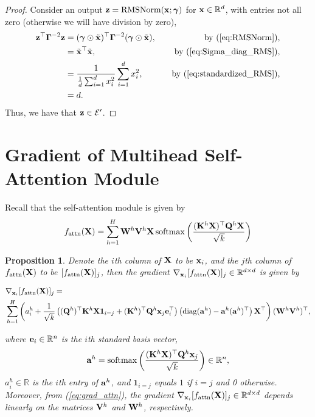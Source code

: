 \documentclass[journal]{IEEEtran}
\newcommand{\bfK}{{\bf K}}
\newcommand{\bfQ}{{\bf Q}}
\newcommand{\bfV}{{\bf V}}
\newcommand{\bfW}{{\bf W}}
\newcommand{\bfX}{{\bf X}}
\newcommand{\bfa}{{\bf a}}
\newcommand{\bfe}{{\bf e}}
\newcommand{\bfx}{{\bf x}}
\newcommand{\bfz}{{\bf z}}
\newcommand{\bfgamma}{{\boldsymbol \gamma}}
\newcommand{\bfGamma}{{\boldsymbol \Gamma}}
\theoremstyle{plain}
\newtheorem{proposition}[theorem]{Proposition}
\theoremstyle{definition}
\theoremstyle{remark}
\begin{document}
\begin{proof}
    Consider an output $\bfz=\text{RMSNorm}(\bfx; \bfgamma)$ for $\bfx \in \mathbb{R}^d$, with entries not all zero (otherwise we will have division by zero),
    \begin{align*}
        \bfz^\top \bfGamma^{-2} \bfz &= (\bfgamma \odot
    \tilde{\bfx})^\top \bfGamma^{-2} (\bfgamma \odot
    \tilde{\bfx}), \quad &\text{by (\ref{eq:RMSNorm}),}\\
    &= \tilde{\bfx}^\top \tilde{\bfx}, \quad &\text{by (\ref{eq:Sigma_diag_RMS}),}\\
    &= \frac{1}{\frac{1}{d}\sum_{i=1}^d x_i^2} \sum_{i=1}^d x_i^2,  \quad &\text{by (\ref{eq:standardized_RMS}),} \\
    &= d.
    \end{align*}
    Thus, we have that $\bfz \in \mathcal{E}'$.
\end{proof} 

\section{Gradient of Multihead Self-Attention Module}
Recall that the self-attention module is given by
\begin{equation}
    f_{\rm attn}(\bfX) = \sum_{h=1}^H  \bfW^h \bfV^h \bfX\, {\rm softmax} \left( \frac{(\bfK^h \bfX)^\top \bfQ^h \bfX}{\sqrt{k}} \right)
\end{equation}

\begin{proposition}\label{prop:grad_attn}
    Denote the $i$th column of $\bfX$ to be $\bfx_i$, and the $j$th column of $f_{\rm attn}(\bfX)$ to be $[f_{\rm attn}(\bfX)]_j$, then the gradient $\nabla_{\bfx_i} [f_{\rm attn}(\bfX)]_j \in \mathbb{R}^{d \times d}$ is given by
    \begin{samepage}
    \begin{align}\label{eq:grad_attn}
    & \nabla_{\bfx_i} [f_{\rm attn}(\bfX)]_j = \\
    & \sum_{h=1}^H \left( a^h_i + \frac{1}{\sqrt{k}} \left((\bfQ^h)^\top \bfK^h \bfX \mathbf{1}_{i=j} + (\bfK^h)^\top \bfQ^h \bfx_j \bfe_i^\top \right) \left({\rm diag}(\bfa^h)-\bfa^h (\bfa^h)^\top \right) \bfX^\top \right) (\bfW^h \bfV^h)^\top ,
    \end{align}
    \end{samepage}
    where $\bfe_i \in \mathbb{R}^{n}$ is the $i$th standard basis vector, 
    $$
    \bfa^h = {\rm softmax} \left( \frac{(\bfK^h \bfX)^\top \bfQ^h \bfx_j}{\sqrt{k}} \right) \in \mathbb{R}^{n},
    $$
    $a^h_i \in \mathbb{R}$ is the $i$th entry of $\bfa^h$, and $\mathbf{1}_{i=j}$ equals $1$ if $i=j$ and 0 otherwise. Moreover, from (\ref{eq:grad_attn}), the gradient $\nabla_{\bfx_i} [f_{\rm attn}(\bfX)]_j \in \mathbb{R}^{d \times d}$ depends linearly on the matrices $\bfV^h$ and $\bfW^h$, respectively.
\end{proposition}
\end{document}
